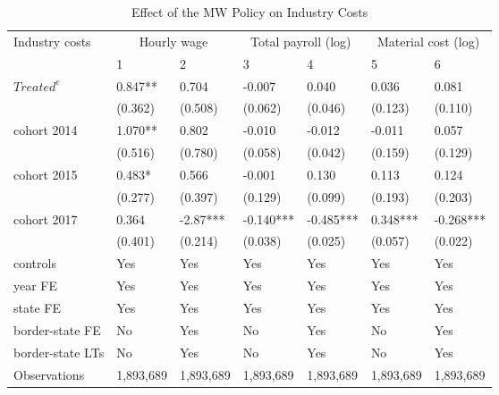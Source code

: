 \begin{table}[H]
    \centering
    \caption{Effect of the MW Policy on Industry Costs}
    \label{tab:baseline-industry-costs}
    \begin{tabular}{@{}lllllll@{}}
        \toprule\toprule
        Industry costs & \multicolumn{2}{c}{Hourly wage} & \multicolumn{2}{c}{Total payroll (log)} & \multicolumn{2}{c}{Material cost (log)} \\
        \cmidrule(lr){2-3}\cmidrule(lr){4-5}\cmidrule(lr){6-7}
        & 1         & 2         & 3         & 4         & 5         & 6         \\ \midrule
        $Treated^{e}$    & 0.847**   & 0.704     & -0.007    & 0.040     & 0.036     & 0.081     \\
        & (0.362)   & (0.508)   & (0.062)   & (0.046)   & (0.123)   & (0.110)   \\
        cohort 2014      & 1.070**   & 0.802     & -0.010    & -0.012    & -0.011    & 0.057     \\
        & (0.516)   & (0.780)   & (0.058)   & (0.042)   & (0.159)   & (0.129)   \\
        cohort 2015      & 0.483*    & 0.566     & -0.001    & 0.130     & 0.113     & 0.124     \\
        & (0.277)   & (0.397)   & (0.129)   & (0.099)   & (0.193)   & (0.203)   \\
        cohort 2017      & 0.364     & -2.87***  & -0.140*** & -0.485*** & 0.348***  & -0.268*** \\
        & (0.401)   & (0.214)   & (0.038)   & (0.025)   & (0.057)   & (0.022)   \\
        controls         & Yes       & Yes       & Yes       & Yes       & Yes       & Yes       \\
        year FE          & Yes       & Yes       & Yes       & Yes       & Yes       & Yes       \\
        state FE         & Yes       & Yes       & Yes       & Yes       & Yes       & Yes       \\
        border-state FE  & No        & Yes       & No        & Yes       & No        & Yes       \\
        border-state LTs & No        & Yes       & No        & Yes       & No        & Yes       \\ \midrule
        Observations     & 1,893,689 & 1,893,689 & 1,893,689 & 1,893,689 & 1,893,689 & 1,893,689 \\

\end{tabular}
\end{table}
